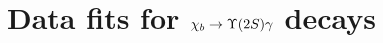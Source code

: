 \section{Data fits for \texorpdfstring{$\chib \to \Y2S \gamma$}{chib --> Y(2S) gamma} decays}
\label{sec:chib:ups2s:fits}


